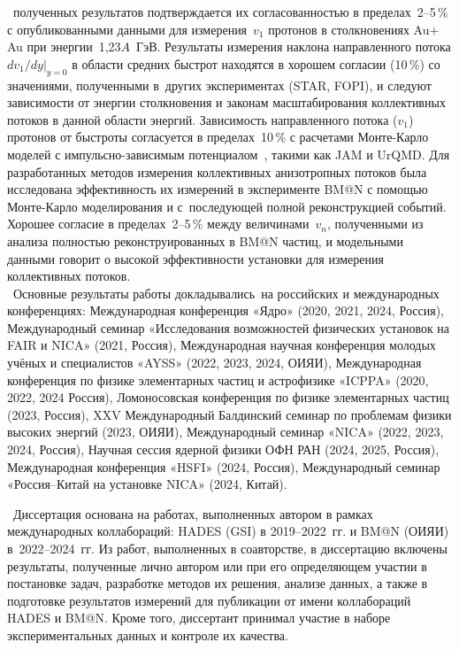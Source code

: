 \reliability\ полученных результатов подтверждается их согласованностью в пределах~2--5\,\% с опубликованными данными для измерения~$v_1$ протонов в столкновениях Au$+$Au при энергии~1,23$A$~ГэВ. 
Результаты измерения наклона направленного потока $dv_1/dy|_{y=0}$ в области средних быстрот находятся в хорошем согласии (10\,\%) со значениями, полученными в~других экспериментах (STAR, FOPI),  и следуют зависимости от энергии столкновения и законам масштабирования коллективных потоков в данной области энергий.
Зависимость направленного потока ($v_1$) протонов от быстроты  согласуется в пределах~10\,\% с расчетами Монте-Карло моделей с импульсно-зависимым потенциалом~\cite{nara2019jam}, такими как JAM и UrQMD.
Для разработанных методов измерения коллективных анизотропных потоков была  исследована эффективность их измерений в эксперименте BM@N с помощью Монте-Карло моделирования и с~последующей полной реконструкцией событий.
Хорошее согласие в пределах~2--5\,\% между величинами~$v_n$,  полученными из анализа полностью реконструированных в BM@N частиц,  и модельными данными говорит о высокой эффективности установки для измерения коллективных потоков.\\

\probation\
Основные результаты работы докладывались~на российских и международных конференциях: 
Международная конференция «Ядро» (2020, 2021, 2024, Россия), 
Международный семинар «Исследования возможностей физических установок на FAIR и NICA» (2021, Россия), 
Международная научная конференция молодых учёных и специалистов «AYSS» (2022, 2023, 2024, ОИЯИ), 
Международная конференция по физике элементарных частиц и астрофизике «ICPPA» (2020, 2022, 2024 Россия), 
Ломоносовская конференция по физике элементарных частиц (2023, Россия), 
XXV Международный Балдинский семинар по проблемам физики высоких энергий (2023, ОИЯИ), 
Международный семинар «NICA» (2022, 2023, 2024, Россия),
Научная сессия ядерной физики ОФН РАН (2024, 2025, Россия),
Международная конференция «HSFI» (2024, Россия),
Международный семинар «Россия--Китай на установке NICA» (2024, Китай).


\contribution\ Диссертация основана на работах, выполненных автором в рамках международных коллабораций: HADES (GSI) в 2019--2022~гг. и BM@N (ОИЯИ) в~2022--2024~гг. 
Из работ, выполненных в соавторстве, в диссертацию включены результаты, полученные лично автором или при его определяющем участии в постановке задач, разработке методов их решения, анализе данных, а также в подготовке результатов измерений для публикации от имени коллабораций HADES и BM@N.
Кроме того, диссертант принимал участие в наборе экспериментальных данных и контроле их качества.

